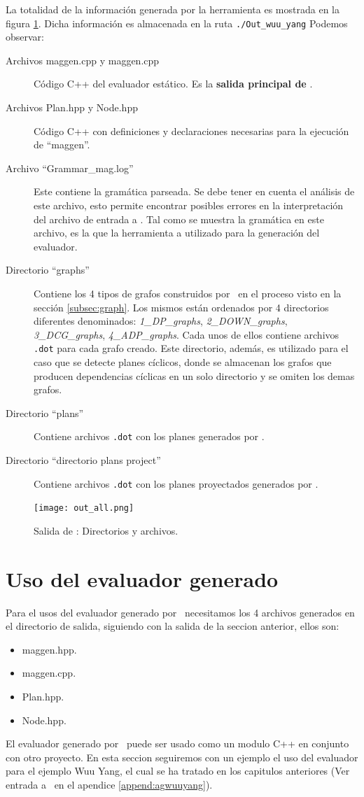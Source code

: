 La totalidad de la información generada por la herramienta es mostrada en la figura \ref{fig:outmagegn}. Dicha información es almacenada en la ruta \texttt{./Out\_wuu\_yang}  Podemos observar:
\begin{description}
\item [Archivos maggen.cpp y maggen.cpp] Código C++ del evaluador estático. Es la \textbf{salida principal de} \maggen.
\item [Archivos Plan.hpp y Node.hpp] Código C++ con definiciones y declaraciones necesarias para la ejecución de ``maggen''.
\item [Archivo ``Grammar\_mag.log''] Este contiene la gramática parseada. Se debe tener en cuenta el análisis de este archivo, esto permite encontrar posibles errores en la interpretación del archivo de entrada a \maggen. Tal como se muestra la gramática en este archivo, es la que la herramienta a utilizado para la generación del evaluador.
\item [Directorio ``graphs''] Contiene los 4 tipos de grafos construidos por \maggen\ en el proceso visto en la sección \ref{subsec:graph}. Los mismos están ordenados por 4 directorios diferentes denominados: \textit{1\_DP\_graphs}, \textit{2\_DOWN\_graphs}, \textit{3\_DCG\_graphs}, \textit{4\_ADP\_graphs}. Cada unos de ellos contiene archivos \texttt{.dot} para cada grafo creado. Este directorio, además, es utilizado para el caso que se detecte planes cíclicos, donde se almacenan los grafos que producen dependencias cíclicas en un solo directorio y se omiten los demas grafos.
\item [Directorio ``plans''] Contiene archivos \texttt{.dot} con los planes generados por \maggen.
\item [Directorio ``directorio plans project''] Contiene archivos \texttt{.dot} con los planes proyectados generados por \maggen.
\end{description}

\begin{figure}\centering
\texttt{[image: out\_all.png]}
\caption{\label{fig:outmagegn} Salida de \maggen: Directorios y archivos.}
\end{figure}


\section{Uso del evaluador generado}
Para el usos del evaluador generado por \maggen\ necesitamos los 4 archivos generados en el directorio de salida, siguiendo con la salida de la seccion anterior, ellos son:
\begin{itemize}
\item maggen.hpp.
\item maggen.cpp.
\item Plan.hpp.
\item Node.hpp.
\end{itemize}
El evaluador generado por \maggen\ puede ser usado como un modulo C++ en conjunto con otro proyecto. En esta seccion seguiremos con un ejemplo el uso del evaluador para el ejemplo Wuu Yang, el cual se ha tratado en los capitulos anteriores (Ver entrada a \maggen\ en el apendice \ref{append:agwuuyang}).

